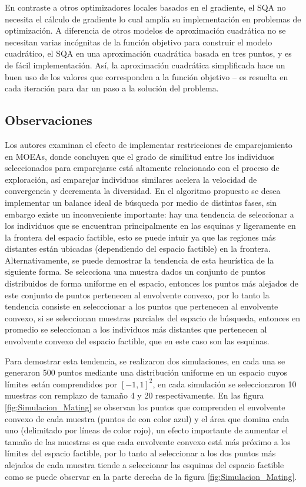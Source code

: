 En contraste a otros optimizadores locales basados en el gradiente, el SQA no necesita el cálculo de gradiente lo cual amplía su implementación en problemas de optimización.
%
A diferencia de otros modelos de aproximación cuadrática no se necesitan varias incógnitas de la función objetivo para construir el modelo cuadrático, el SQA en una aproximación cuadrática basada en tres puntos, y es de fácil implementación.
%
Así, la aproximación cuadrática simplificada hace un buen uso de los valores que corresponden a la función objetivo -- es resuelta en cada iteración para dar un paso a la solución del problema.

\subsection{Observaciones}
Los autores  \cite{Joel:STUDY_MATTING_RESTRICTION} examinan el efecto de implementar restricciones de emparejamiento en MOEAs, donde concluyen que el grado de similitud entre los individuos seleccionados para emparejarse está altamente relacionado con el proceso de exploración, así emparejar individuos similares acelera la velocidad de convergencia y decrementa la diversidad.
%
En el algoritmo propuesto se desea implementar un balance ideal de búsqueda por medio de distintas fases, sin embargo existe un inconveniente importante: hay una tendencia de seleccionar a los individuos que se encuentran principalmente en las esquinas y ligeramente en la frontera del espacio factible, esto se puede intuir ya que las regiones más distantes están ubicadas (dependiendo del espacio factible) en la frontera.
%
Alternativamente, se puede demostrar la tendencia de esta heurística de la siguiente forma. 
%
Se selecciona una muestra dados un conjunto de puntos distribuidos de forma uniforme en el espacio, entonces los puntos más alejados de este conjunto de puntos pertenecen al envolvente convexo, por lo tanto la tendencia consiste en selecccionar a los puntos que pertenecen al envolvente convexo, si se seleccionan muestras parciales del espacio de búsqueda, entonces en promedio se seleccionan a los individuos más distantes que pertenecen al envolvente convexo del espacio factible, que en este caso son las esquinas.
%


Para demostrar esta tendencia, se realizaron dos simulaciones, en cada una se generaron 500 puntos mediante una distribución uniforme en un espacio cuyos límites están comprendidos por $[-1, 1]^2$, en cada simulación se seleccionaron 10 muestras con remplazo de tamaño 4 y 20 respectivamente.
%
En las figura \ref{fig:Simulacion_Mating} se observan los puntos que comprenden el envolvente convexo de cada muestra (puntos de con color azul) y el área que domina cada uno (delimitado por líneas de color rojo), un efecto importante de aumentar el tamaño de las muestras es que cada envolvente convexo está más próximo a los límites del espacio factible, por lo tanto al seleccionar a los dos puntos más alejados de cada muestra tiende a seleccionar las esquinas del espacio factible como se puede observar en la parte derecha de la figura \ref{fig:Simulacion_Mating}.
%

